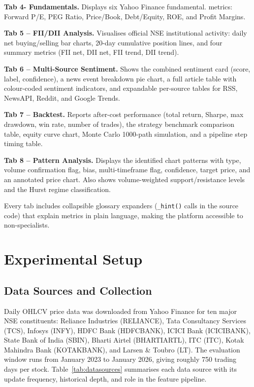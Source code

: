 \documentclass[10pt,a4paper,twoside]{article}
\begin{document}
\textbf{Tab 4- Fundamentals.} Displays six Yahoo Finance fundamental.
metrics: Forward P/E, PEG Ratio, Price/Book, Debt/Equity, ROE, and
Profit Margins.

\textbf{Tab 5 -- FII/DII Analysis.} Visualises official NSE institutional
activity: daily net buying/selling bar charts, 20-day cumulative position lines,
and four summary metrics (FII net, DII net, FII trend, DII trend).

\textbf{Tab 6 -- Multi-Source Sentiment.} Shows the combined sentiment card
(score, label, confidence), a news event breakdown pie chart, a full
article table with colour-coded sentiment indicators, and expandable per-source
tables for RSS, NewsAPI, Reddit, and Google Trends.

\textbf{Tab 7 -- Backtest.} Reports after-cost performance (total return, Sharpe,
max drawdown, win rate, number of trades), the strategy benchmark comparison table,
equity curve chart, Monte Carlo 1000-path simulation, and a pipeline step timing
table.

\textbf{Tab 8 -- Pattern Analysis.} Displays the identified chart patterns with type,
volume confirmation flag, bias, multi-timeframe flag, confidence, target price,
and an annotated price chart. Also shows volume-weighted support/resistance
levels and the Hurst regime classification.

Every tab includes collapsible glossary expanders (\texttt{\_hint()} calls in
the source code) that explain metrics in plain language, making the platform
accessible to non-specialists.

\section{Experimental Setup}
\label{sec:setup}

\subsection{Data Sources and Collection}

Daily OHLCV price data was downloaded from Yahoo Finance for ten major NSE
constituents: Reliance Industries (RELIANCE), Tata Consultancy Services (TCS),
Infosys (INFY), HDFC Bank (HDFCBANK), ICICI Bank (ICICIBANK), State Bank of
India (SBIN), Bharti Airtel (BHARTIARTL), ITC (ITC), Kotak Mahindra Bank
(KOTAKBANK), and Larsen \& Toubro (LT). The evaluation window runs from
January 2023 to January 2026, giving roughly 750 trading days per stock.
Table~\ref{tab:datasources} summarises each data source with its update
frequency, historical depth, and role in the feature pipeline.
\end{document}
